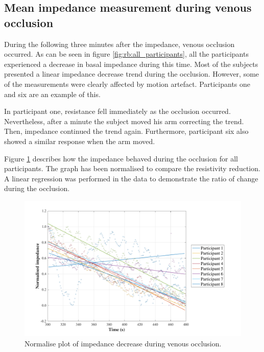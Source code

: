 \subsection{Mean impedance measurement during venous occlusion}
\label{section results 2.2}
During the following three minutes after the impedance, venous occlusion occurred. As can be seen in figure \ref{fig:rb:all_participants}, all the participants experienced a decrease in basal impedance during this time. Most of the subjects presented a linear impedance decrease trend during the occlusion. However, some of the measurements were clearly affected by motion artefact. Participants one and six are an example of this. 

In participant one, resistance fell immediately as the occlusion occurred. Nevertheless, after a minute the subject moved his arm correcting the trend. Then, impedance continued the trend again. Furthermore,  participant six also showed a similar response when the arm moved. 

Figure \ref{fig:normalise:venous_occlusion} describes how the impedance behaved during the occlusion for all participants. The graph has been normalised to compare the resistivity reduction.  A linear regression was performed in the data to demonstrate the ratio of change during the occlusion.

\begin{figure}[!htbp]
	\centering
	\includegraphics[width=\textwidth,keepaspectratio]{figure3}    
	\caption{Normalise plot of impedance decrease during venous occlusion.}
	\label{fig:normalise:venous_occlusion}
\end{figure}  

